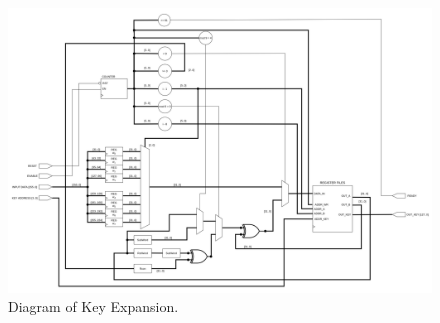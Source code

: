 \documentclass[a4paper, 10pt]{article}
\begin{document}
        \noindent
        \begin{figure}[t]
            \centering
            \includegraphics[width=\textwidth]{KeyExpansion.png}
            \caption{Diagram of Key Expansion.}
            \label{fig:KeyExpansion}
        \end{figure}
\end{document}
